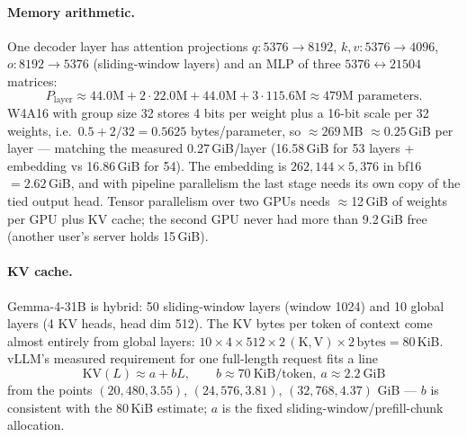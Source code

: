 \documentclass[10pt,a4paper]{article}
\newcommand{\1}{\mathbb{1}}
\begin{document}
\paragraph{Memory arithmetic.} One decoder layer has attention projections $q: 5376\!\to\!8192$,
$k,v: 5376\!\to\!4096$, $o: 8192\!\to\!5376$ (sliding-window layers) and an MLP of three
$5376\leftrightarrow21504$ matrices:
\[
P_\text{layer}\approx 44.0\text{M}+2\cdot22.0\text{M}+44.0\text{M}+3\cdot115.6\text{M}\approx 479\text{M parameters}.
\]
W4A16 with group size 32 stores 4 bits per weight plus a 16-bit scale per 32 weights,
i.e.\ $0.5+2/32=0.5625$ bytes/parameter, so $\approx 269$\,MB $\approx 0.25$\,GiB per layer --- matching the
measured 0.27\,GiB/layer (16.58\,GiB for 53 layers + embedding vs 16.86\,GiB for 54). The embedding is
$262{,}144\times5{,}376$ in bf16 $=2.62$\,GiB, and with pipeline parallelism the last stage needs its own copy of the
tied output head. Tensor parallelism over two GPUs needs $\approx$12\,GiB of weights per GPU plus KV cache;
the second GPU never had more than 9.2\,GiB free (another user's server holds 15\,GiB).

\paragraph{KV cache.} Gemma-4-31B is hybrid: 50 sliding-window layers (window 1024) and 10 global layers
(4 KV heads, head dim 512). The KV bytes per token of context come almost entirely from global layers:
$10\times4\times512\times2\,(\text{K},\text{V})\times2\,\text{bytes}=80$\,KiB. vLLM's measured requirement for one
full-length request fits a line
\[
\text{KV}(L)\approx a+bL,\qquad b\approx 70\ \text{KiB/token},\ a\approx2.2\ \text{GiB}
\]
from the points $(20{,}480,3.55)$, $(24{,}576,3.81)$, $(32{,}768,4.37)$ GiB --- $b$ is consistent with the 80\,KiB
estimate; $a$ is the fixed sliding-window/prefill-chunk allocation.
\end{document}
